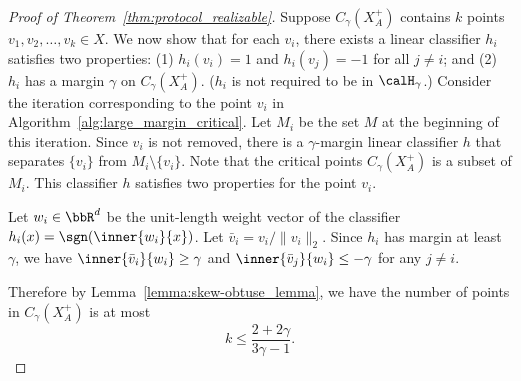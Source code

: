 \begin{proof}[Proof of Theorem~\ref{thm:protocol_realizable}]
    Suppose $C_\gamma(X_A^+)$ contains $k$ points $v_1,v_2, \dots, v_k \in X$. We now show that for each $v_i$, there exists a linear classifier $h_i$ satisfies two properties: (1) $h_i(v_i) = 1$ and $h_i(v_j) = -1$ for all $j \neq i$; and (2) $h_i$ has a margin $\gamma$ on $C_\gamma(X_A^+)$. ($h_i$ is not required to be in $\calH_\gamma$.) Consider the iteration corresponding to the point $v_i$ in Algorithm~\ref{alg:large_margin_critical}. Let $M_i$ be the set $M$ at the beginning of this iteration. Since $v_i$ is not removed, there is a $\gamma$-margin linear classifier $h$ that separates $\{v_i\}$ from $M_i \setminus \{v_i\}$. Note that the critical points $C_\gamma(X_A^+)$ is a subset of $M_i$. This classifier $h$ satisfies two properties for the point $v_i$.
    
    
    Let $w_i \in \bbR^d$ be the unit-length weight vector of the classifier $h_i(x) = \sgn(\inner{w_i}{x})$. Let $\bar{v}_i = v_i/\|v_i\|_2$. Since $h_i$ has margin at least $\gamma$, we have $\inner{\bar{v}_i}{w_i} \geq \gamma$ and $\inner{\bar{v}_j}{w_i} \leq -\gamma$ for any $j \neq i$. 

    
    Therefore by Lemma~\ref{lemma:skew-obtuse_lemma}, we have the number of points in $C_\gamma(X_A^+)$ is at most 
    $$
    k \leq \frac{2+2\gamma}{3\gamma-1}.
    $$
\end{proof}

